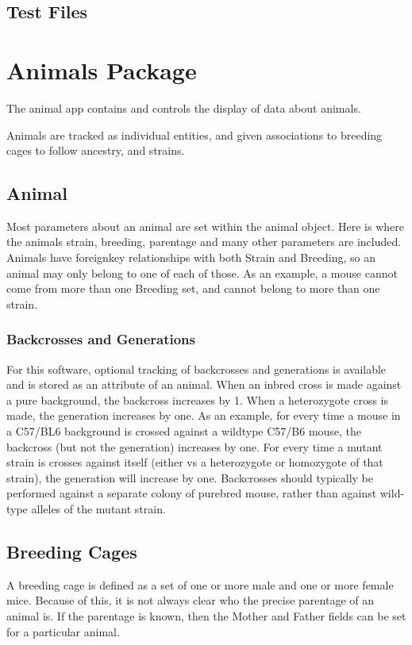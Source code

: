 \documentclass[letterpaper,10pt,english]{sphinxmanual}
\begin{document}
\subsection{Test Files}
\label{api:test-files}

\section{Animals Package}
\label{api:animals-package}\label{api:module-animal}
The animal app contains and controls the display of data about animals.


Animals are tracked as individual entities, and given associations to breeding cages to follow ancestry, and strains.



\subsection{Animal}
\label{api:animal}
Most parameters about an animal are set within the animal object.  Here is where the animals strain, breeding, parentage and many other parameters are included.  Animals have foreignkey relationships with both Strain and Breeding, so an animal may only belong to one of each of those.  As an example, a mouse cannot come from more than one Breeding set, and cannot belong to more than one strain.



\subsubsection{Backcrosses and Generations}
\label{api:backcrosses-and-generations}
For this software, optional tracking of backcrosses and generations is available and is stored as an attribute of an animal.  When an inbred cross is made against a pure background, the backcross increases by 1.  When a heterozygote cross is made, the generation increases by one.  As an example, for every time a mouse in a C57/BL6 background is crossed against a wildtype C57/B6 mouse, the backcross (but not the generation) increases by one.  For every time a mutant strain is crosses against itself (either vs a heterozygote or homozygote of that strain), the generation will increase by one.  Backcrosses should typically be performed against a separate colony of purebred mouse, rather than against wild-type alleles of the mutant strain.



\subsection{Breeding Cages}
\label{api:breeding-cages}
A breeding cage is defined as a set of one or more male and one or more female mice.  Because of this, it is not always clear who the precise parentage of an animal is.  If the parentage is known, then the Mother and Father fields can be set for a particular animal.
\end{document}
